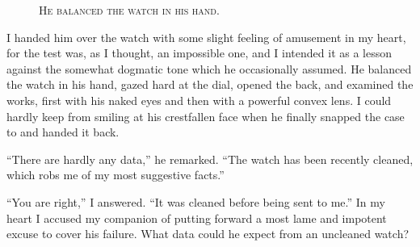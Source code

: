 \documentclass[12pt,english,oneside]{book}
\newcommand{\noun}[1]{\textsc{#1}}
\begin{document}
%
\begin{figure}[htbp]
\noindent {}

\noindent \begin{center}\noun{He balanced the watch in his hand.}\end{center}
\end{figure}
I handed him over the watch with some slight feeling of amusement
in my heart, for the test was, as I thought, an impossible one, and
I intended it as a lesson against the somewhat dogmatic tone which
he occasionally assumed. He balanced the watch in his hand, gazed
hard at the dial, opened the back, and examined the works, first with
his naked eyes and then with a powerful convex lens. I could hardly
keep from smiling at his crestfallen face when he finally snapped
the case to and handed it back.

{}``There are hardly any data,'' he remarked. {}``The watch has
been recently cleaned, which robs me of my most suggestive facts.''

{}``You are right,'' I answered. {}``It was cleaned before being
sent to me.'' In my heart I accused my companion of putting forward
a most lame and impotent excuse to cover his failure. What data could
he expect from an uncleaned watch?
\end{document}
